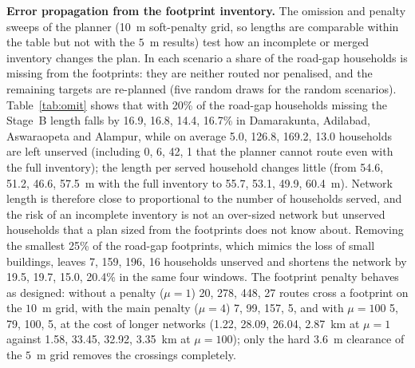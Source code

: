 \documentclass[10pt,a4paper,twocolumn]{article}
\begin{document}
\textbf{Error propagation from the footprint inventory.} The omission and penalty sweeps of the planner (10~m soft-penalty grid, so lengths are comparable within the table but not with the $5$~m results) test how an incomplete or merged inventory changes the plan. In each scenario a share of the road-gap households is missing from the footprints: they are neither routed nor penalised, and the remaining targets are re-planned (five random draws for the random scenarios). Table~\ref{tab:omit} shows that with 20\% of the road-gap households missing the Stage~B length falls by 16.9, 16.8, 14.4, 16.7\% in Damarakunta, Adilabad, Aswaraopeta and Alampur, while on average 5.0, 126.8, 169.2, 13.0 households are left unserved (including 0, 6, 42, 1 that the planner cannot route even with the full inventory); the length per served household changes little (from 54.6, 51.2, 46.6, 57.5~m with the full inventory to 55.7, 53.1, 49.9, 60.4~m). Network length is therefore close to proportional to the number of households served, and the risk of an incomplete inventory is not an over-sized network but unserved households that a plan sized from the footprints does not know about. Removing the smallest 25\% of the road-gap footprints, which mimics the loss of small buildings, leaves 7, 159, 196, 16 households unserved and shortens the network by 19.5, 19.7, 15.0, 20.4\% in the same four windows. The footprint penalty behaves as designed: without a penalty ($\mu=1$) 20, 278, 448, 27 routes cross a footprint on the $10$~m grid, with the main penalty ($\mu=4$) 7, 99, 157, 5, and with $\mu=100$ 5, 79, 100, 5, at the cost of longer networks (1.22, 28.09, 26.04, 2.87~km at $\mu=1$ against 1.58, 33.45, 32.92, 3.35~km at $\mu=100$); only the hard $3.6$~m clearance of the $5$~m grid removes the crossings completely.
\end{document}
